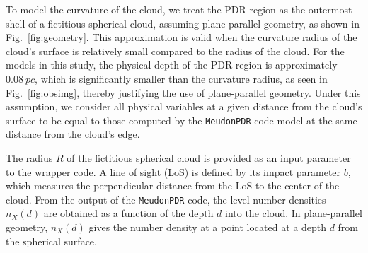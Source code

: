 \documentclass[12pt,a4paper]{article}
\newcommand{\mdpdr}{\texttt{MeudonPDR} code}
\begin{document}
To model the curvature of the cloud, we treat the PDR region as the outermost shell of a fictitious spherical cloud, assuming plane-parallel geometry, as shown in Fig.~\ref{fig:geometry}. This approximation is valid when the curvature radius of the cloud's surface is relatively small compared to the radius of the cloud. For the models in this study, the physical depth of the PDR region is approximately $\qty{0.08}{pc}$, which is significantly smaller than the curvature radius, as seen in Fig.~\ref{fig:obsimg}, thereby justifying the use of plane-parallel geometry. Under this assumption, we consider all physical variables at a given distance from the cloud's surface to be equal to those computed by the \mdpdr{} model at the same distance from the cloud's edge.

The radius $R$ of the fictitious spherical cloud is provided as an input parameter to the wrapper code. A line of sight (LoS) is defined by its impact parameter $b$, which measures the perpendicular distance from the LoS to the center of the cloud. From the output of the \mdpdr{}, the level number densities $n_X(d)$ are obtained as a function of the depth $d$ into the cloud. In plane-parallel geometry, $n_X(d)$ gives the number density at a point located at a depth $d$ from the spherical surface. 
\end{document}
